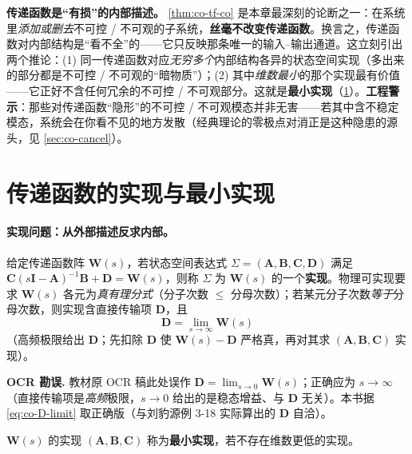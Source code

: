 \begin{insight}
\textbf{传递函数是“有损”的内部描述。}\;
\cref{thm:co-tf-co} 是本章最深刻的论断之一：在系统里\emph{添加或删去}不可控 / 不可观的子系统，\textbf{丝毫不改变传递函数}。换言之，传递函数对内部结构是“看不全”的——它只反映那条唯一的输入--输出通道。这立刻引出两个推论：(1) 同一传递函数对应\emph{无穷多个}内部结构各异的状态空间实现（多出来的部分都是不可控 / 不可观的“暗物质”）；(2) 其中\emph{维数最小}的那个实现最有价值——它正好不含任何冗余的不可控 / 不可观部分。这就是\textbf{最小实现}（\cref{sec:co-minreal}）。\textbf{工程警示}：那些对传递函数“隐形”的不可控 / 不可观模态并非无害——若其中含不稳定模态，系统会在你看不见的地方发散（经典理论的零极点对消正是这种隐患的源头，见 \cref{sec:co-cancel}）。
\end{insight}

\section{传递函数的实现与最小实现}
\label{sec:co-minreal}

\paragraph{实现问题：从外部描述反求内部。}
给定传递函数阵 $\mathbf{W}(s)$，若状态空间表达式 $\Sigma=(\mathbf{A},\mathbf{B},\mathbf{C},\mathbf{D})$ 满足 $\mathbf{C}(s\mathbf{I}-\mathbf{A})^{-1}\mathbf{B}+\mathbf{D}=\mathbf{W}(s)$，则称 $\Sigma$ 为 $\mathbf{W}(s)$ 的一个\textbf{实现}\cite{liubao2006modern}。物理可实现要求 $\mathbf{W}(s)$ 各元为\emph{真有理分式}（分子次数 $\le$ 分母次数）；若某元分子次数\emph{等于}分母次数，则实现含直接传输项 $\mathbf{D}$，且
\begin{equation}
  \mathbf{D}=\lim_{s\to\infty}\mathbf{W}(s)
  \label{eq:co-D-limit}
\end{equation}
（高频极限给出 $\mathbf{D}$；先扣除 $\mathbf{D}$ 使 $\mathbf{W}(s)-\mathbf{D}$ 严格真，再对其求 $(\mathbf{A},\mathbf{B},\mathbf{C})$ 实现）\cite{liubao2006modern}。

\begin{note}
\textbf{OCR 勘误.}\;
教材原 OCR 稿此处误作 $\mathbf{D}=\lim_{s\to 0}\mathbf{W}(s)$；正确应为 $s\to\infty$（直接传输项是\emph{高频}极限，$s\to0$ 给出的是稳态增益、与 $\mathbf{D}$ 无关）。本书据 \cref{eq:co-D-limit} 取正确版（与刘豹源例 3-18 实际算出的 $\mathbf{D}$ 自洽）。
\end{note}

\begin{definition}[最小实现]\label{def:co-minreal}
$\mathbf{W}(s)$ 的实现 $(\mathbf{A},\mathbf{B},\mathbf{C})$ 称为\textbf{最小实现}，若不存在维数更低的实现\cite{liubao2006modern}。
\end{definition}

